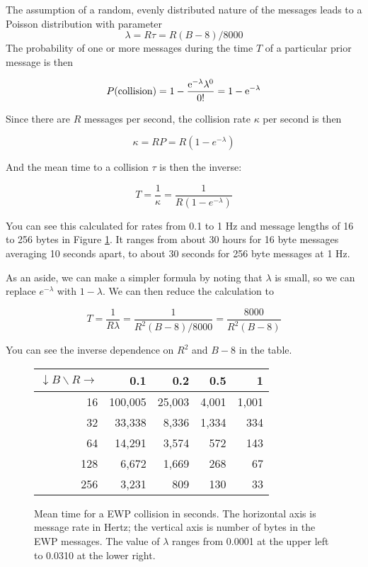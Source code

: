 \documentclass[11pt]{article}
\begin{document}
The assumption of a random, evenly distributed nature of the messages leads to 
a Poisson distribution with parameter 
$$\lambda = R \tau = R (B-8)/8000 $$ 
The probability of one or more messages during the time $T$
of a particular prior message is then

$$ P(\rm{collision}) 
    = 1 - \frac {{e^{-\lambda} \lambda^0}} {0!} 
    = 1 - e^{-\lambda} $$

Since there are $R$ messages per second, the collision rate $\kappa$
per second is then

$$ \kappa = R P = R  ( 1 - e^{-\lambda} ) $$

And the mean time to a collision $\tau$ is then the inverse:

$$ T = \frac{1}{\kappa} = \frac{1}{R  ( 1 - e^{-\lambda} )}$$

You can see this calculated for rates from 0.1 to 1 Hz
and message lengths of 16 to 256 bytes in 
Figure \ref{fig:mean_collision_time}. It ranges 
from about 30 hours for 16 byte messages averaging 10 seconds
apart, to about 30 seconds for 256 byte messages at 1 Hz.

As an aside, we can make a simpler formula by noting that 
$\lambda$ is small, so we can replace $e^{-\lambda}$ with $1-\lambda$.
We can then reduce the calculation to 

$$ T = \frac{1}{R \lambda}
    = \frac{1}{R^2(B-8)/8000 }
    = \frac{8000}{R^2(B-8)} $$

You can see the inverse dependence on $R^2$ and $B-8$ in the table.

\begin{figure}[!tbp]
\begin{center}
\begin{tabular}{ r || r | r | r | r}

$\downarrow B \backslash R \rightarrow$ 
    & 0.1 & 0.2 & 0.5 & 1 \\ \hline
\hline
16 & 100,005 & 25,003 & 4,001 & 1,001 \\ \hline
32 & 33,338 & 8,336 & 1,334 & 334 \\ \hline
64 & 14,291 & 3,574 & 572 & 143 \\ \hline
128 & 6,672 & 1,669 & 268 & 67 \\ \hline
256 & 3,231 & 809 & 130 & 33 \\ \hline

\end{tabular}
\end{center}
\caption{Mean time for a EWP collision in seconds. 
    The horizontal axis is message rate in Hertz;
    the vertical axis is number of bytes in the EWP messages.
    The value of $\lambda$ ranges from 0.0001 at the upper left 
    to 0.0310 at the lower right.}
\label{fig:mean_collision_time}
\end{figure}
\end{document}
